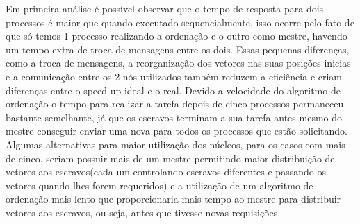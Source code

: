 \documentclass[9pt]{IEEEtran}
\begin{document}
	\begin{table}[H]
		\centering
		\label{table}
		\caption{blabla}
	\end{table}

	Em primeira análise é possível observar que o tempo de resposta para dois
	processos é maior que quando executado sequencialmente, isso ocorre pelo
	fato de que só temos 1 processo realizando a ordenação e o outro como
	mestre, havendo um tempo extra de troca de mensagens entre os dois. Essas
	pequenas diferenças, como a troca de mensagens, a reorganização dos vetores
	nas suas posições inicias e a comunicação entre os 2 nós utilizados também
	reduzem a eficiência e criam diferenças entre o speed-up ideal e o real.
	Devido a velocidade do algoritmo de ordenação o tempo para realizar a tarefa
	depois de cinco processos permaneceu bastante semelhante, já que os escravos
	terminam a sua tarefa antes mesmo do mestre conseguir enviar uma nova para
	todos os processos que estão solicitando.  Algumas alternativas para maior
	utilização dos núcleos, para os casos com mais de cinco, seriam possuir mais
	de um mestre permitindo maior distribuição de vetores aos escravos(cada um
	controlando escravos diferentes e passando os vetores quando lhes forem
	requeridos) e a utilização de um algoritmo de ordenação mais lento que
	proporcionaria mais tempo ao mestre para distribuir vetores aos escravos, ou
	seja, antes que tivesse novas requisições.
\end{document}
